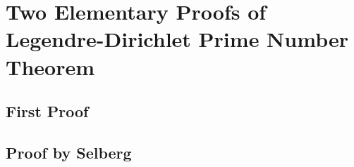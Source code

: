 \documentclass[elemannt.tex]{subfile}
\begin{document}
	\chapter{Two Elementary Proofs of Legendre-Dirichlet Prime Number Theorem}\label{ch:legendre}
	\section{First Proof}
	\section{Proof by Selberg}
\end{document}
